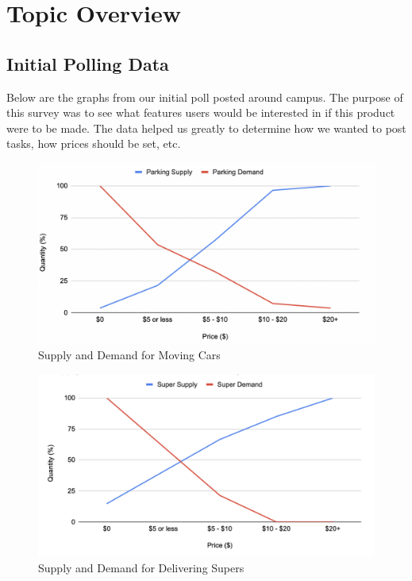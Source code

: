 \chapter{Topic Overview}
\label{ch:chap1}

\section{Initial Polling Data}
Below are the graphs from our initial poll posted around campus. The purpose of this survey was to see what features users would be interested in if this product were to be made. The data helped us greatly to determine how we wanted to post tasks, how prices should be set, etc. 

\begin{figure}[ht]
        \centering
        \caption{Supply and Demand for Moving Cars}
        \includegraphics[width=1\textwidth]{images/cars.png}
        
        \label{fig:bird1}
    \end{figure}

\begin{figure}[ht]
        \centering
        \caption{Supply and Demand for Delivering Supers}
        \includegraphics[width=1\textwidth]{images/supers.png}
        
        \label{fig:bird1}
    \end{figure}

